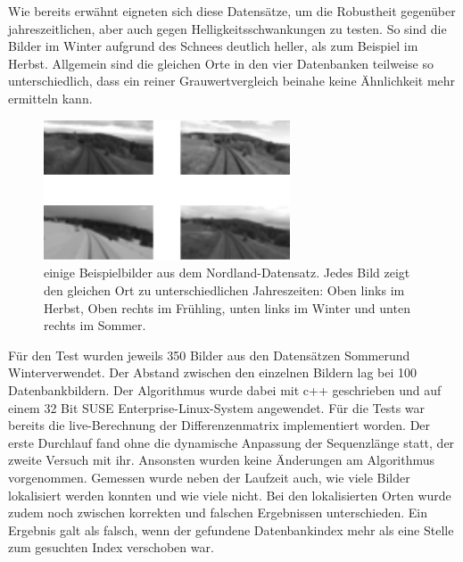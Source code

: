 \documentclass[12pt,a4paper,titlepage]{scrartcl}
\begin{document}
Wie bereits erwähnt eigneten sich diese Datensätze, um die Robustheit gegenüber jahreszeitlichen, aber auch gegen Helligkeitsschwankungen zu testen. So sind die Bilder im Winter aufgrund des Schnees deutlich heller, als zum Beispiel im Herbst. Allgemein sind die gleichen Orte in den vier Datenbanken teilweise so unterschiedlich, dass ein reiner Grauwertvergleich beinahe keine Ähnlichkeit mehr ermitteln kann. 
\begin{figure}[ht]
	\centering
	\includegraphics[width=0.65\textwidth]{../Bilder/Nordland_Datensatz.pdf}
	\caption[Beispiel Bilder aus dem Nordland-Datensatz]{einige Beispielbilder aus dem Nordland-Datensatz. Jedes Bild zeigt den gleichen Ort zu unterschiedlichen Jahreszeiten: Oben links im Herbst, Oben rechts im Frühling, unten links im Winter und unten rechts im Sommer.}
	\label{img:Nordland}
\end{figure}

Für den Test wurden jeweils 350 Bilder aus den Datensätzen \glqq Sommer\grqq{ }und \glqq Winter\grqq{ }verwendet. Der Abstand zwischen den einzelnen Bildern lag bei 100 Datenbankbildern. Der Algorithmus wurde dabei mit c++ geschrieben und auf einem 32 Bit SUSE Enterprise-Linux-System angewendet. Für die Tests war bereits die live-Berechnung der Differenzenmatrix implementiert worden. Der erste Durchlauf fand ohne die dynamische Anpassung der Sequenzlänge statt, der zweite Versuch mit ihr. Ansonsten wurden keine Änderungen am Algorithmus vorgenommen. Gemessen wurde neben der Laufzeit auch, wie viele Bilder lokalisiert werden konnten und wie viele nicht. Bei den lokalisierten Orten wurde zudem noch zwischen korrekten und falschen Ergebnissen unterschieden. Ein Ergebnis galt als falsch, wenn der gefundene Datenbankindex mehr als eine Stelle zum gesuchten Index verschoben war. 
\end{document}
